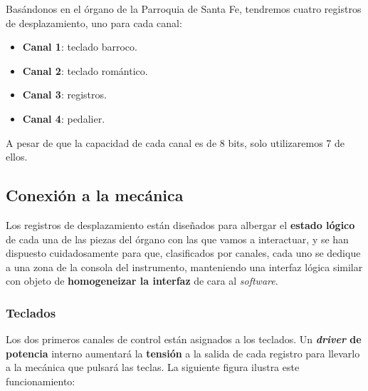 \smallskip

Basándonos en el órgano de la Parroquia de Santa Fe, tendremos cuatro registros de desplazamiento, uno para cada canal:

\begin{itemize}
	\item \textbf{Canal 1}: teclado barroco.
	\item \textbf{Canal 2}: teclado romántico.
	\item \textbf{Canal 3}: registros.
	\item \textbf{Canal 4}: pedalier.
\end{itemize}

A pesar de que la capacidad de cada canal es de 8 bits, solo utilizaremos 7 de ellos.

\subsection{Conexión a la mecánica}
\label{subsec:conexion_mecanica}

Los registros de desplazamiento están diseñados para albergar el \textbf{estado lógico} de cada una de las piezas del órgano con las que vamos a interactuar, y se han dispuesto cuidadosamente para que, clasificados por canales, cada uno se dedique a una zona de la consola del instrumento, manteniendo una interfaz lógica similar con objeto de \textbf{homogeneizar la interfaz} de cara al \textit{software}.

\subsubsection{Teclados}

Los dos primeros canales de control están asignados a los teclados. Un \textbf{\textit{driver} de potencia} interno aumentará la \textbf{tensión} a la salida de cada registro para llevarlo a la mecánica que pulsará las teclas. La siguiente figura ilustra este funcionamiento:

\smallskip

